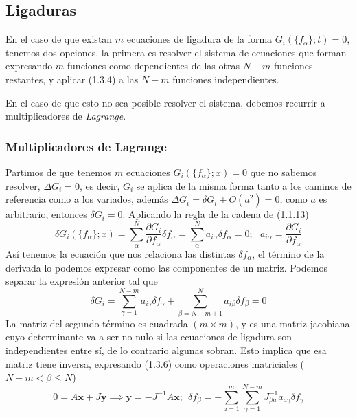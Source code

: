 \subsection{Ligaduras}
En el caso de que existan $m$ ecuaciones de ligadura de la forma $G_i(\{f_\alpha\};t)=0$, tenemos dos opciones, la primera es resolver el sistema de ecuaciones que forman expresando $m$ funciones como dependientes de las otras $N-m$ funciones restantes, y aplicar (1.3.4) a las $N-m$ funciones independientes.

En el caso de que esto no sea posible resolver el sistema, debemos recurrir a multiplicadores de \textit{Lagrange}.
\subsubsection{Multiplicadores de Lagrange}
Partimos de que tenemos $m$ ecuaciones $G_i(\{f_\alpha\};x)=0$ que no sabemos resolver, $\Delta G_i =0$, es decir, $G_i$ se aplica de la misma forma tanto a los caminos de referencia como a los variados, además $\Delta G_i = \delta G_i + O(a^2) = 0$, como $a$ es arbitrario, entonces $\delta G_i =0$. Aplicando la regla de la cadena de (1.1.13)
\begin{equation} \label{1.3.5}
    \delta G_i(\{f_\alpha\};x) = \sum_\alpha^N{\frac{\partial G_i}{\partial f_\alpha} \delta f_\alpha}=\sum_\alpha^N{a_{i\alpha} \delta f_\alpha}=0; \ \ \ a_{i\alpha} = \frac{\partial G_i}{\partial f_\alpha}
\end{equation} 
Así tenemos la ecuación que nos relaciona las distintas $\delta f_\alpha$, el término de la derivada lo podemos expresar como las componentes de un matriz. Podemos separar la expresión anterior tal que
\begin{equation} \label{1.3.6}
    \delta G_i= \sum_{\gamma=1}^{N-m}{a_{i\gamma} \delta f_\gamma} + \sum_{\beta=N-m+1}^{N}{a_{i\beta} \delta f_\beta} = 0
\end{equation} 
La matriz del segundo término es cuadrada $(m\times m)$, y es una matriz jacobiana cuyo determinante va a ser no nulo si las ecuaciones de ligadura son independientes entre sí, de lo contrario algunas sobran. Esto implica que esa matriz tiene inversa, expresando (1.3.6) como operaciones matriciales ($N-m < \beta \leq N$)
\begin{equation} \label{1.3.7}
    0= A\mathbf{x} + J\mathbf{y} \implies \mathbf{y}=-J^{-1}A\mathbf{x}; \ \ \delta f_\beta = -\sum_{a=1}^m{\sum_{\gamma =1}^{N-m}{J^{-1}_{\beta a}a_{a\gamma}\delta f_\gamma}}
\end{equation} 
